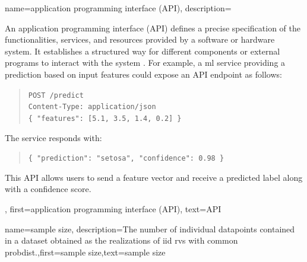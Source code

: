 {name={application programming interface (API)},
	description={An application programming 
		interface (API) defines a precise specification of the functionalities, services, 
		and resources provided by a software or hardware system. It establishes a 
		structured way for different components or external programs to interact with 
		the system \cite{RestfulBook2013}. For example, a \gls{ml} service 
		providing a \gls{prediction} based on input \gls{feature}s could expose an 
		API endpoint as follows:
		\begin{quote}
		\texttt{POST /predict}\\
		\texttt{Content-Type: application/json}\\
		\texttt{\{ "features": [5.1, 3.5, 1.4, 0.2] \}}
		\end{quote}
		The service responds with:
		\begin{quote} 
		\texttt{\{ "prediction": "setosa", "confidence": 0.98 \}}
		\end{quote}
		This API allows users to send a feature vector and receive a predicted 
		label along with a confidence score.
	},
	first={application programming interface (API)},
	text={API}
}





	
{name=sample size,
	description={The number of individual \gls{datapoint}s 
		contained in a \gls{dataset} obtained as the \gls{realization}s of \gls{iid} \gls{rv}s with 
		common \gls{probdist}.},first={sample size},text={sample size}
}

